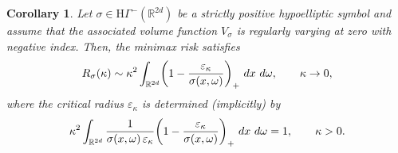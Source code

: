 \documentclass[a4paper,12pt]{article}
\newtheorem{corollary}[theorem]{Corollary}%
\let\originalleft\left
\let\originalright\right
\renewcommand{\left}{\mathopen{}\mathclose\bgroup\originalleft}
\renewcommand{\right}{\aftergroup\egroup\originalright}
\newcommand{\R}{\mathbb{R}}
\newcommand{\diff}{\mathop{}\!d}
\newcommand{\hyponegclass}{\mathrm{H}\Gamma^-}
\begin{document}






\begin{corollary}\label{cor:MR-Main}
Let $\sigma\in\hyponegclass(\R^{2d})$ be a strictly positive hypoelliptic symbol
and assume that the associated volume function $V_\sigma$ is regularly varying at
zero with negative index. Then, the minimax risk satisfies
\begin{equation}\label{eq:main-res-risk-1-corr}
    R_{\sigma}(\kappa)
    \sim
    \kappa^{2}
    \int_{\R^{2d}}
        \left(1-\frac{\varepsilon_\kappa}{\sigma(x,\omega)}\right)_{+}
        \,\diff x\,\diff\omega,
    \qquad \kappa \to 0,
\end{equation}
where the critical radius $\varepsilon_\kappa$ is determined (implicitly) by
\begin{equation}\label{eq:main-res-risk-2-corr}
    \kappa^{2}
    \int_{\R^{2d}}
        \frac{1}{\sigma(x,\omega)\,\varepsilon_\kappa}
        \left(1-\frac{\varepsilon_\kappa}{\sigma(x,\omega)}\right)_{+}
        \,\diff x\,\diff\omega
    = 1,
    \qquad \kappa>0.
\end{equation}
\end{corollary}
\end{document}
